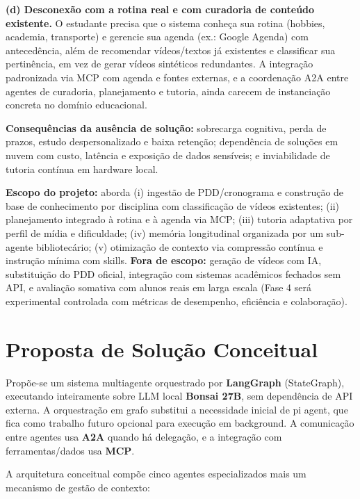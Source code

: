 \documentclass[12pt]{article}
\begin{document}
\textbf{(d) Desconexão com a rotina real e com curadoria de conteúdo existente.} O estudante precisa que o sistema conheça sua rotina (hobbies, academia, transporte) e gerencie sua agenda (ex.: Google Agenda) com antecedência, além de recomendar vídeos/textos já existentes e classificar sua pertinência, em vez de gerar vídeos sintéticos redundantes. A integração padronizada via MCP com agenda e fontes externas, e a coordenação A2A entre agentes de curadoria, planejamento e tutoria, ainda carecem de instanciação concreta no domínio educacional.

\textbf{Consequências da ausência de solução:} sobrecarga cognitiva, perda de prazos, estudo despersonalizado e baixa retenção; dependência de soluções em nuvem com custo, latência e exposição de dados sensíveis; e inviabilidade de tutoria contínua em hardware local.

\textbf{Escopo do projeto:} aborda (i) ingestão de PDD/cronograma e construção de base de conhecimento por disciplina com classificação de vídeos existentes; (ii) planejamento integrado à rotina e à agenda via MCP; (iii) tutoria adaptativa por perfil de mídia e dificuldade; (iv) memória longitudinal organizada por um sub-agente bibliotecário; (v) otimização de contexto via compressão contínua e instrução mínima com skills. \textbf{Fora de escopo:} geração de vídeos com IA, substituição do PDD oficial, integração com sistemas acadêmicos fechados sem API, e avaliação somativa com alunos reais em larga escala (Fase 4 será experimental controlada com métricas de desempenho, eficiência e colaboração).

\section{Proposta de Solução Conceitual}
\label{sec:solucao}

Propõe-se um sistema multiagente orquestrado por \textbf{LangGraph} (StateGraph), executando inteiramente sobre LLM local \textbf{Bonsai 27B}, sem dependência de API externa. A orquestração em grafo substitui a necessidade inicial de pi agent, que fica como trabalho futuro opcional para execução em background. A comunicação entre agentes usa \textbf{A2A} quando há delegação, e a integração com ferramentas/dados usa \textbf{MCP}.

A arquitetura conceitual compõe cinco agentes especializados mais um mecanismo de gestão de contexto:
\end{document}
